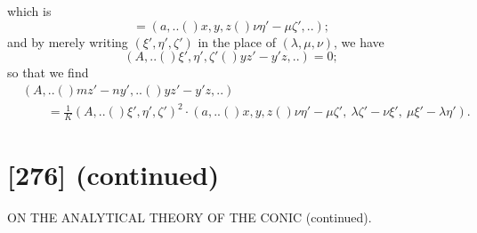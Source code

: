 \documentclass[11pt,a4paper]{book}
\providecommand{\qform}[1]{(#1)}
\begin{document}
which is
\[
= (a,..\!\qform{}{x, y, z}\!\qform{}{\nu\eta' - \mu\zeta',..});
\]
and by merely writing $(\xi', \eta', \zeta')$ in the place of $(\lambda, \mu, \nu)$, we have
\[
(A,..\!\qform{}{\xi', \eta', \zeta'}\!\qform{}{yz' - y'z,..}) = 0;
\]
so that we find
\begin{align*}
&(A,..\!\qform{}{mz' - ny',..}\!\qform{}{yz' - y'z,..})\\
&\qquad = \frac{1}{K}(A,..\!\qform{}{\xi', \eta', \zeta'})^{2} \cdot (a,..\!\qform{}{x, y, z}\!\qform{}{\nu\eta' - \mu\zeta',\ \lambda\zeta' - \nu\xi',\ \mu\xi' - \lambda\eta'}).
\end{align*}

\newpage
\section*{[276] (continued)}
\begin{center}
{\large ON THE ANALYTICAL THEORY OF THE CONIC (continued).}
\end{center}
\end{document}
